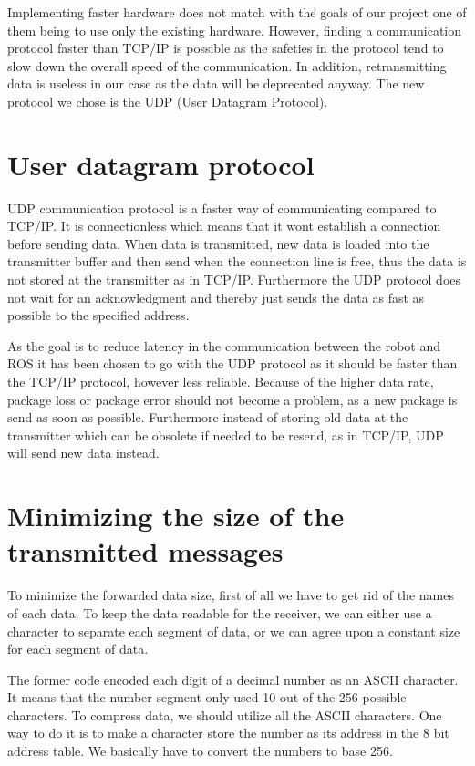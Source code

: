 Implementing faster hardware does not match with the goals of our project one of them being to use only the existing hardware. 
However, finding a communication protocol faster than TCP/IP is possible as the safeties in the protocol tend to slow down the overall speed of the communication. In addition, retransmitting data is useless in our case as the data will be deprecated anyway. The new protocol we chose is the UDP (User Datagram Protocol).

\section*{User datagram protocol}
UDP communication protocol is a faster way of communicating compared to TCP/IP. It is connectionless which means that it wont establish a connection before sending data. When data is transmitted, new data is loaded into the transmitter buffer and then send when the connection line is free, thus the data is not stored at the transmitter as in TCP/IP. Furthermore the UDP protocol does not wait for an acknowledgment and thereby just sends the data as fast as possible to the specified address.

As the goal is to reduce latency in the communication between the robot and ROS it has been chosen to go with the UDP protocol as it should be faster than the TCP/IP protocol, however less reliable. Because of the higher data rate, package loss or package error should not become a problem, as a new package is send as soon as possible. Furthermore instead of storing old data at the transmitter which can be obsolete if needed to be resend, as in TCP/IP, UDP will send new data instead.

\section*{Minimizing the size of the transmitted messages}

To minimize the forwarded data size, first of all we have to get rid of the names of each data. To keep the data readable for the receiver, we can either use a character to separate each segment of data, or we can agree upon a constant size for each segment of data.

The former code encoded each digit of a decimal number as an ASCII character. It means that the number segment only used 10 out of the 256 possible characters. To compress data, we should utilize all the ASCII characters. One way to do it is to make a character store the number as its address in the 8 bit address table. We basically have to convert the numbers to base 256.

